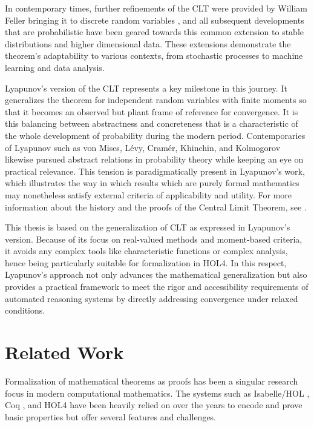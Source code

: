 In contemporary times, further refinements of the CLT were provided by William Feller bringing it to discrete random variables \cite{feller1945}, and all subsequent developments that are probabilistic have been geared towards this common extension to stable distributions and higher dimensional data. These extensions demonstrate the theorem’s adaptability to various contexts, from stochastic processes to machine learning and data analysis.

Lyapunov’s version of the CLT represents a key milestone in this journey. It generalizes the theorem for independent random variables with finite moments so that it becomes an observed but pliant frame of reference for convergence. It is this balancing between abstractness and concreteness that is a characteristic of the whole development of probability during the modern period. Contemporaries of Lyapunov such as von Mises, Lévy, Cramér, Khinchin, and Kolmogorov likewise pursued abstract relations in probability theory while keeping an eye on practical relevance. This tension is paradigmatically present in Lyapunov's work, which illustrates the way in which results which are purely formal mathematics may nonetheless satisfy external criteria of applicability and utility. For more information about the history and the proofs of the Central Limit Theorem, see \cite{fischer2011history, adams2009life}.

This thesis is based on the generalization of CLT as expressed in Lyapunov's version. Because of its focus on real-valued methods and moment-based criteria, it avoids any complex tools like characteristic functions or complex analysis, hence being particularly suitable for formalization in HOL4. In this respect, Lyapunov's approach not only advances the mathematical generalization but also provides a practical framework to meet the rigor and accessibility requirements of automated reasoning systems by directly addressing convergence under relaxed conditions.

\section{Related Work}

Formalization of mathematical theorems as proofs has been a singular research focus in modern computational mathematics. The systems such as Isabelle/HOL \cite{isabelle}, Coq \cite{bertot2013interactive}, and HOL4 \cite{slind2008brief} have been heavily relied on over the years to encode and prove basic properties but offer several features and challenges.

